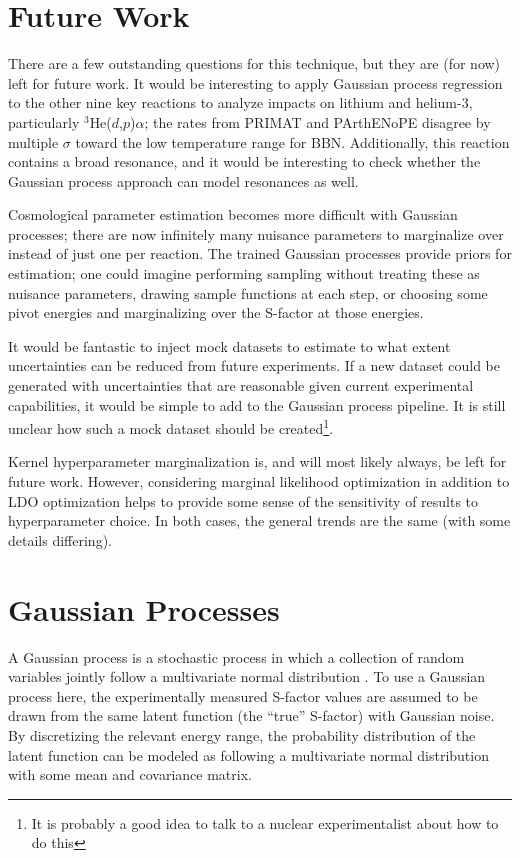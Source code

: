 \documentclass[%
 reprint,
superscriptaddress,
nofootinbib,
 amsmath,amssymb,
 aps,
 pra,
]{revtex4-2}
\begin{document}
\section{Future Work}



There are a few outstanding questions for this technique, but they are (for now) left for future work. It would be interesting to apply Gaussian process regression to the other nine key reactions to analyze impacts on lithium and helium-3, particularly $^3$He($d$,$p$)$\alpha$; the rates from PRIMAT and PArthENoPE disagree by multiple $\sigma$ toward the low temperature range for BBN. Additionally, this reaction contains a broad resonance, and it would be interesting to check whether the Gaussian process approach can model resonances as well. 

Cosmological parameter estimation becomes more difficult with Gaussian processes; there are now infinitely many nuisance parameters to marginalize over instead of just one per reaction. The trained Gaussian processes provide priors for estimation; one could imagine performing sampling without treating these as nuisance parameters, drawing sample functions at each step, or choosing some pivot energies and marginalizing over the S-factor at those energies. 

It would be fantastic to inject mock datasets to estimate to what extent uncertainties can be reduced from future experiments. If a new dataset could be generated with uncertainties that are reasonable given current experimental capabilities, it would be simple to add to the Gaussian process pipeline. It is still unclear how such a mock dataset should be created\footnote{It is probably a good idea to talk to a nuclear experimentalist about how to do this}. 

Kernel hyperparameter marginalization is, and will most likely always, be left for future work. However, considering marginal likelihood optimization in addition to LDO optimization helps to provide some sense of the sensitivity of results to hyperparameter choice. In both cases, the general trends are the same (with some details differing). 



\section{Gaussian Processes}



A Gaussian process is a stochastic process in which a collection of random variables jointly follow a multivariate normal distribution \cite{Rasmussen2006}. To use a Gaussian process here, the experimentally measured S-factor values are assumed to be drawn from the same latent function (the ``true'' S-factor) with Gaussian noise. By discretizing the relevant energy range, the probability distribution of the latent function can be modeled as following a multivariate normal distribution with some mean and covariance matrix.
\end{document}
